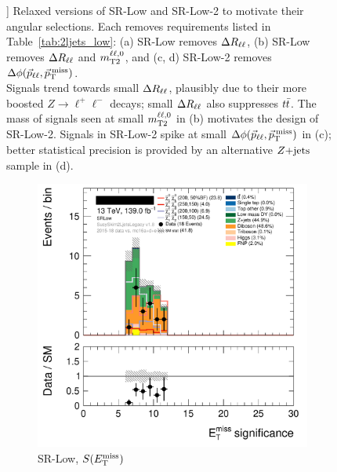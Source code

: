 \begin{figure}[tp]
]{%
Relaxed versions of SR-Low and SR-Low-2 to motivate their angular selections.
Each removes requirements listed in Table~\ref{tab:2ljets_low}:
(a) SR-Low removes $\Delta R_{\ell\ell}$,
(b) SR-Low removes $\Delta R_{\ell\ell}$ and $m_\mathrm{T2}^{\ell\ell,0}$,
and
(c, d) SR-Low-2 removes $\Delta\phi(\vec p_{\ell\ell}, \vec p_\mathrm{T}^\mathrm{\:miss})$.
\\[0.5em]
Signals trend towards small $\Delta R_{\ell\ell}$, plausibly due to their more boosted
$Z\to \ell^+\ell^-$ decays; small $\Delta R_{\ell\ell}$ also suppresses $t\bar t$.
The mass of signals seen at small $m_\mathrm{T2}^{\ell\ell,0}$ in (b) motivates the design of
SR-Low-2.
Signals in SR-Low-2 spike at small $\Delta\phi(\vec p_{\ell\ell}, \vec p_\mathrm{T}^\mathrm{\:miss})$ in (c); better statistical
precision is provided by an alternative $Z\mathrm{+jets}$ sample in (d).
}
\label{fig:2ljets_low_minus}
\end{figure}

\begin{figure}[tp]
\centering
\begin{subfigure}{0.48\textwidth}
\centering
\includegraphics[width=\textwidth]{figures/2ljets_def_met_Sign_SRLow.png}
\caption{SR-Low, $S(E_\mathrm{T}^\mathrm{miss})$}
\end{subfigure}
\hfill
\begin{subfigure}{0.48\textwidth}
\centering

\end{subfigure}
\end{figure}
